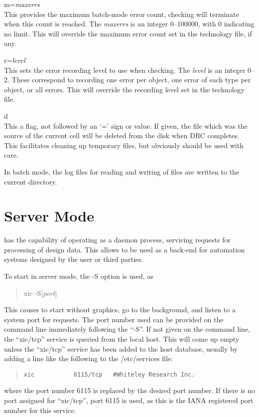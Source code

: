 \begin{description}
\begin{description}
\item{\vt m=}{\it maxerrs}\\
This provides the maximum batch-mode error count, checking will
terminate when this count is reached.  The {\it maxerrs} is an
integer 0--100000, with 0 indicating no limit.  This will override
the maximum error count set in the technology file, if any.

\item{\vt r=}{\it level}\\
This sets the error recording level to use when checking.  The {\it
level} is an integer 0--2.  These correspond to recording one error
per object, one error of each type per object, or all errors.  This
will override the recording level set in the technology file.

\item{\vt d}\\
This a flag, not followed by an `=' sign or value.  If given, the file
which was the source of the current cell will be deleted from the disk
when DRC completes.  This facilitates cleaning up temporary files,
but obviously should be used with care.
\end{description}
\end{description}

In batch mode, the log files for reading and writing of files are
written to the current directory.  


\section{Server Mode}
\label{servermode}

{\Xic} has the capability of operating as a daemon process, servicing
requests for processing of design data.  This allows {\Xic} to be used
as a back-end for automation systems designed by the user or third
parties.

To start {\Xic} in server mode, the {\vt -S} option is used, as
\begin{quote}
{\vt xic -S}[{\it port\/}]
\end{quote}

This causes {\Xic} to start without graphics, go to the background,
and listen to a system port for requests.  The port number used can be
provided on the command line immediately following the ``{\vt -S}''.  If
not given on the command line, the ``{\vt xic/tcp}'' service is
queried from the local host.  This will come up empty unless the
``{\vt xic/tcp}'' service has been added to the host database, usually
by adding a line like the following to the {\vt /etc/services} file:
\begin{quote}
\begin{verbatim}
xic           6115/tcp   #Whiteley Research Inc.
\end{verbatim}
\end{quote}
where the port number 6115 is replaced by the desired port number.  If
there is no port assigned for ``{\vt xic/tcp}'', port 6115 is used,
as this is the IANA registered port number for this service.

